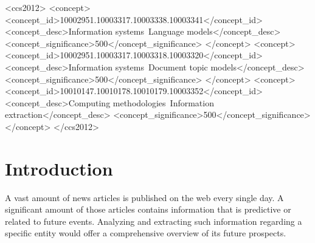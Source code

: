 \documentclass[sigconf]{acmart}
\begin{document}
\begin{CCSXML}
<ccs2012>
   <concept>
       <concept_id>10002951.10003317.10003338.10003341</concept_id>
       <concept_desc>Information systems~Language models</concept_desc>
       <concept_significance>500</concept_significance>
       </concept>
   <concept>
       <concept_id>10002951.10003317.10003318.10003320</concept_id>
       <concept_desc>Information systems~Document topic models</concept_desc>
       <concept_significance>500</concept_significance>
       </concept>
   <concept>
       <concept_id>10010147.10010178.10010179.10003352</concept_id>
       <concept_desc>Computing methodologies~Information extraction</concept_desc>
       <concept_significance>500</concept_significance>
       </concept>
 </ccs2012>
\end{CCSXML}




\maketitle

\section{Introduction}
A vast amount of news articles is published on the web every single day. A significant amount of those articles contains information that is predictive or related to future events. Analyzing and extracting such information regarding a specific entity would offer a comprehensive overview of its future prospects.
\end{document}
